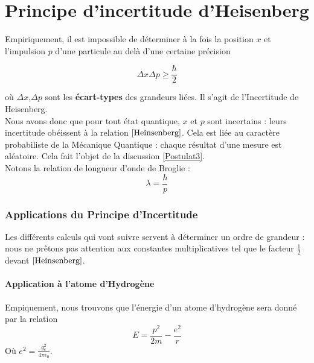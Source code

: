 \documentclass[../Notes de cours]{subfiles}
\begin{document}
\part{Principe d'incertitude d'Heisenberg}
Empiriquement, il est impossible de déterminer à la fois la position $x$ et l'impulsion $p$ d'une particule au delà d'une certaine précision

\begin{equation}
\label{Heinsenberg}
\Delta x \Delta p \geq \frac{\hbar}{2}
\end{equation}

où $\Delta x$,$\Delta p$ sont les \textbf{écart-types} des grandeurs liées. Il s'agit de l'Incertitude de Heisenberg.\\

Nous avons donc que pour tout état quantique, $x$ et $p$ sont incertains : leurs incertitude obéissent à la relation $\ref{Heinsenberg}$. Cela est liée au caractère probabiliste de la Mécanique Quantique : chaque résultat d'une mesure est aléatoire. Cela fait l'objet de la discussion \ref{Postulat3}.\\

Notons la relation de longueur d'onde de Broglie : 
\begin{equation}
\label{Broglie}
\lambda = \frac{h}{p}
\end{equation}

\section{Applications du Principe d'Incertitude}
Les différents calculs qui vont suivre servent à déterminer un ordre de grandeur : nous ne prêtons pas attention aux constantes multiplicatives tel que le facteur $\frac{1}{2}$ devant $\ref{Heinsenberg}$.
\subsection{Application à l'atome d'Hydrogène}
Empiquement, nous trouvons que l'énergie d'un atome d'hydrogène sera donné par la relation
\begin{equation}
\label{Energie hydrogène}
E = \frac{p^2}{2m} - \frac{e^2}{r}
\end{equation}
Où $e^2 = \frac{q_e^2}{4 \pi \epsilon_0}$.\\
\end{document}
